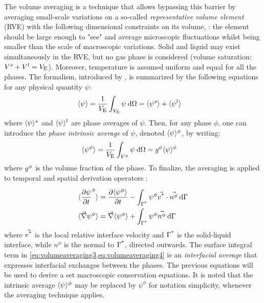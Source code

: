The volume averaging is a technique that allows bypassing this barrier by averaging
small-scale variations on a so-called \emph{representative volume element} (RVE) \citep{dantzig_solidification_2009} with the 
following dimensional constraints on its volume, \rev:
the element should be large enough to "see" and average microscopic fluctuations whilst being smaller than the scale of macroscopic variations.
Solid and liquid may exist simultaneously in the RVE, but no gas phase is considered (volume saturation: $V^s+V^l=V_\text{E}$). 
Moreover, temperature is assumed uniform and equal for all the phases.
The formalism, introduced by \citet{ni_volume-averaged_1991}, is summarized by the following equations for any physical quantity $\psi$:
\begin{align}
\label{eq:volumeaveraging1}
& \langle \psi \rangle = \frac{1}{V_\text{E}} \int_{V_\text{E}} \psi\: \mathrm{d}\Omega = \langle \psi^s \rangle + \langle \psi^l \rangle
\end{align}
where $\langle \psi \rangle^s$ and $\langle \psi \rangle^l$ are phase averages of $\psi$. Then, for any phase $\phi$, one can introduce the \emph{phase intrinsic average} of $\psi$, denoted $\langle \psi \rangle^\phi$, by writing:
\begin{align}
\label{eq:volumeaveraging2}
& \langle \psi^\phi \rangle = \frac{1}{V_\text{E}} \int_{V^\phi} \psi\: \mathrm{d}\Omega = g^{\phi}  \langle \psi \rangle^\phi
\end{align}
where $g^{\phi} $ is the volume fraction of the phase. To finalize, the averaging is applied to temporal and spatial derivation operators \citep{rivaux_simulation_2011}:
\begin{align}
\label{eq:volumeaveraging3}
& \langle  \frac{\partial \psi}{\partial t} ^\phi  \rangle = \frac{\partial \langle \psi^\phi \rangle}{\partial t} - \int_{{\Gamma}^{\text{*}} } \psi^\phi \vec{v^\text{*}} \cdot \vec{n^\phi}\: \mathrm{d}\Gamma \\
\label{eq:volumeaveraging4}
& \langle  \vec{\nabla} \psi^\phi  \rangle = \vec{\nabla} \langle \psi^\phi \rangle + \int_{{\Gamma}^{\text{*}} } \psi^\phi \vec{n^\phi}\: \mathrm{d}\Gamma
\end{align}
where $\vec{v^\text{*}}$ is the local relative interface velocity and ${\Gamma}^{\text{*}} $ is the solid-liquid interface, 
while $n^\phi$ is the normal to ${\Gamma}^{\text{*}} $, directed outwards. The surface integral term in 
\cref{eq:volumeaveraging3,eq:volumeaveraging4} is an \emph{interfacial average} 
that expresses interfacial exchanges between the phases. The previous equations will 
be used to derive a set macroscopic conservation equations. 
It is noted that the intrinsic average $\langle \psi \rangle^\phi$ may be replaced by ${\psi}^\phi$ 
for notation simplicity, whenever the averaging technique applies.
%
%
